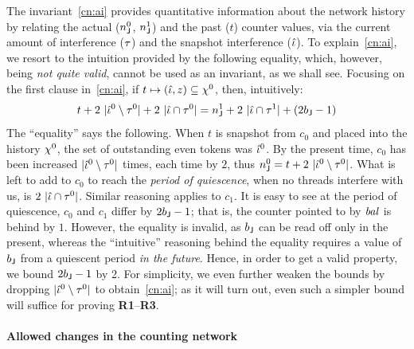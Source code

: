 \noindent
The invariant~\ref{cn:ai} provides quantitative information about the
network history by relating the actual ($n^0_{\mathsf{J}}$, $n^1_{\mathsf{J}}$)
and the past ($t$) counter values, via the current amount of
interference ($\tau$) and the snapshot interference ($\hat{\iota}$).
%
To explain~\ref{cn:ai}, we resort to the intuition provided by the
following equality, which, however, being \emph{not quite valid},
cannot be used as an invariant, as we shall see. Focusing on the
first clause in~\ref{cn:ai}, if
$t \mapsto (\hat{\iota}, z) \subseteq \chi^0$, then,
intuitively:
%
{\small{
\[
t + 2\ |\tknh^0 \setminus \tkn^0 | + 2\ |\tknh \cap \tkn^0| =
n^1_\joint + 2\ |\tknh \cap \tkn^1| + (2 b_\joint - 1)
\]}}
%
\noindent
The ``equality'' says the following. When $t$ is snapshot from $c_0$
and placed into the history $\chi^0$, the set of outstanding even
tokens was $\hat{\iota}^0$. By the present time, $c_0$ has been increased
$|\hat{\iota}^0 \setminus \tau^0|$ times, each time by $2$, thus $n^0_{\mathsf{J}}
= t + 2\ |\hat{\iota}^0 \setminus \tau^0|$. What is left to add to $c_0$ to
reach the \emph{period of quiescence}, when no threads interfere with
us, is $2\ |\hat{\iota} \cap \tau^0|$. Similar reasoning applies to
$c_1$. It is easy to see at the period of quiescence, $c_0$ and $c_1$
differ by $2 b_{\mathsf{J}} - 1$; that is, the counter pointed to by $\mathit{bal}$
is behind by $1$. However, the equality is invalid, as $b_{\mathsf{J}}$ can
be read off only in the present, whereas the ``intuitive'' reasoning
behind the equality requires a value of $b_{\mathsf{J}}$ from a quiescent
period \emph{in the future}. Hence, in order to get a valid property,
we bound $2 b_{\mathsf{J}} - 1$ by 2. For simplicity, we even further weaken
the bounds by dropping $|\hat{\iota}^0 \setminus \tau^0|$ to
obtain~\ref{cn:ai}; as it will turn out, even such a simpler bound
will suffice for proving \textbf{R1}--\textbf{R3}.



\paragraph{Allowed changes in the counting network}
\label{sec:count-netw-prot}


